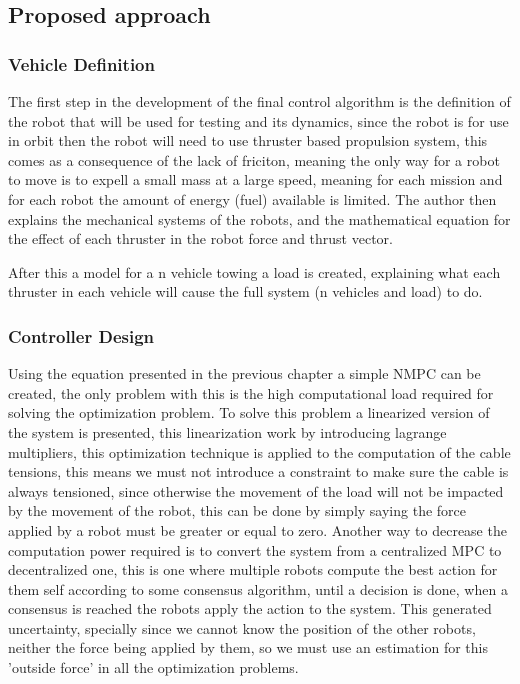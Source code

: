 \documentclass[a4paper,12pt]{article}
\begin{document}
\subsection{Proposed approach}

\subsubsection{Vehicle Definition}
The first step in the development of the final control algorithm is the definition of the robot that will be used for testing and its dynamics, since the robot is for use in orbit then the robot will need to use thruster based propulsion system, this comes as a consequence of the lack of friciton, meaning the only way for a robot to move is to expell a small mass at a large speed, meaning for each mission and for each robot the amount of energy (fuel) available is limited. The author then explains the mechanical systems of the robots, and the mathematical equation for the effect of each thruster in the robot force and thrust vector.

After this a model for a n vehicle towing a load is created, explaining what each thruster in each vehicle will cause the full system (n vehicles and load) to do.

\subsubsection{Controller Design}
Using the equation presented in the previous chapter a simple NMPC can be created, the only problem with this is the high computational load required for solving the optimization problem. To solve this problem a linearized version of the system is presented, this linearization work by introducing lagrange multipliers, this optimization technique is applied to the computation of the cable tensions, this means we must not introduce a constraint to make sure the cable is always tensioned, since otherwise the movement of the load will not be impacted by the movement of the robot, this can be done by simply saying the force applied by a robot must be greater or equal to zero. Another way to decrease the computation power required is to convert the system from a centralized MPC to decentralized one, this is one where multiple robots compute the best action for them self according to some consensus algorithm, until a decision is done, when a consensus is reached the robots apply the action to the system. This generated uncertainty, specially since we cannot know the position of the other robots, neither the force being applied by them, so we must use an estimation for this 'outside force' in all the optimization problems.
\end{document}
